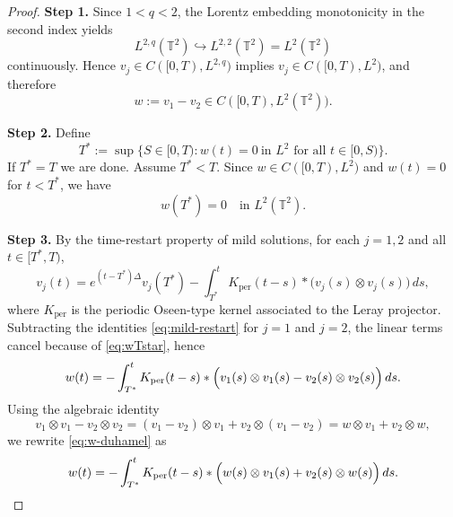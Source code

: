 \documentclass[12pt]{article}
\theoremstyle{remark}
\theoremstyle{remark}
\begin{document}
\begin{proof}
\textbf{Step 1.}
Since $1<q<2$, the Lorentz embedding monotonicity in the second index yields
\[
L^{2,q}(\mathbb T^2)\hookrightarrow L^{2,2}(\mathbb T^2)=L^2(\mathbb T^2)
\]
continuously. Hence $v_j\in C([0,T),L^{2,q})$ implies $v_j\in C([0,T),L^2)$, and therefore
\[
w:=v_1-v_2\in C([0,T),L^2(\mathbb T^2)).
\]

\textbf{Step 2.}
Define
\[
T^*:=\sup\{S\in[0,T): w(t)=0\ \text{in }L^2 \text{ for all }t\in[0,S)\}.
\]
If $T^*=T$ we are done. Assume $T^*<T$. Since $w\in C([0,T),L^2)$ and $w(t)=0$ for $t<T^*$, we have
\begin{equation}\label{eq:wTstar}
w(T^*)=0\quad\text{in }L^2(\mathbb T^2).
\end{equation}

\textbf{Step 3.}
By the time-restart property of mild solutions, for each $j=1,2$ and all $t\in[T^*,T)$,
\begin{equation}\label{eq:mild-restart}
v_j(t)=e^{(t-T^*)\Delta}v_j(T^*)
-\int_{T^*}^{t} K_{\mathrm{per}}(t-s)*\bigl(v_j(s)\otimes v_j(s)\bigr)\,ds,
\end{equation}
where $K_{\mathrm{per}}$ is the periodic Oseen-type kernel associated to the Leray projector. Subtracting the identities \eqref{eq:mild-restart} for $j=1$ and $j=2$,
the linear terms cancel because of \eqref{eq:wTstar}, hence
\begin{equation}\label{eq:w-duhamel}
w(t)=-\int_{T^*}^{t} K_{\mathrm{per}}(t-s)*
\Bigl(v_1(s)\otimes v_1(s)-v_2(s)\otimes v_2(s)\Bigr)\,ds.
\end{equation}
Using the algebraic identity
\[
v_1\otimes v_1-v_2\otimes v_2=(v_1-v_2)\otimes v_1+v_2\otimes(v_1-v_2)=w\otimes v_1+v_2\otimes w,
\]
we rewrite \eqref{eq:w-duhamel} as
\begin{equation}\label{eq:w-duhamel2}
w(t)=-\int_{T^*}^{t} K_{\mathrm{per}}(t-s)*
\Bigl(w(s)\otimes v_1(s)+v_2(s)\otimes w(s)\Bigr)\,ds.
\end{equation}


\end{proof}
\end{document}
